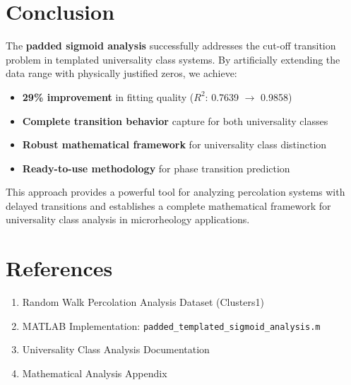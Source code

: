 \documentclass[11pt]{article}
\begin{document}
\section{Conclusion}

The \textbf{padded sigmoid analysis} successfully addresses the cut-off transition problem in templated universality class systems. By artificially extending the data range with physically justified zeros, we achieve:

\begin{itemize}
    \item \textbf{29\% improvement} in fitting quality ($R^2$: 0.7639 $\to$ 0.9858)
    \item \textbf{Complete transition behavior} capture for both universality classes
    \item \textbf{Robust mathematical framework} for universality class distinction
    \item \textbf{Ready-to-use methodology} for phase transition prediction
\end{itemize}

This approach provides a powerful tool for analyzing percolation systems with delayed transitions and establishes a complete mathematical framework for universality class analysis in microrheology applications.

\section{References}

\begin{enumerate}
    \item Random Walk Percolation Analysis Dataset (Clusters1)
    \item MATLAB Implementation: \texttt{padded\_templated\_sigmoid\_analysis.m}
    \item Universality Class Analysis Documentation
    \item Mathematical Analysis Appendix
\end{enumerate}
\end{document}
